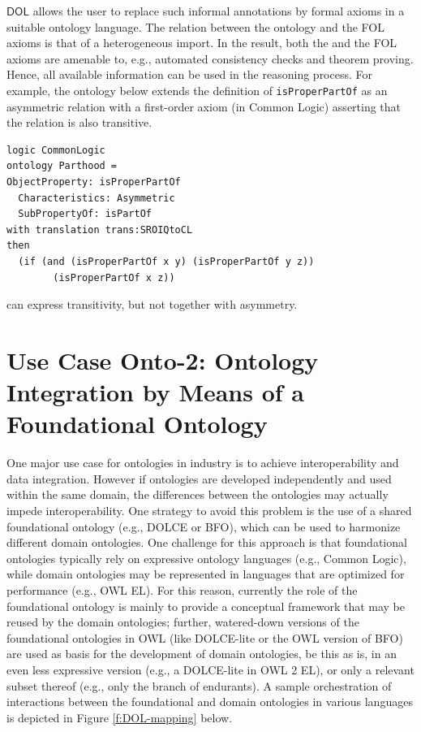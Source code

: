 \documentclass[10pt,fleqn,final]{scrreprt}
\newcommand*{\DOL}{\ensuremath{\mathsf{DOL}}\xspace}
\newenvironment{definitions}[0]{\medskip }{}
\begin{document}
\begin{definitions}
\DOL allows the user to replace such informal annotations by formal axioms in a suitable ontology 
language. The relation between the \OWL ontology and the FOL axioms is that of a heterogeneous 
import. In the result, both the \OWL and the FOL axioms are amenable to, e.g., automated consistency 
checks and theorem proving. Hence, all available information can be used in the reasoning process.
For example, the ontology below extends the \OWL definition of \texttt{isProperPartOf} as an asymmetric relation
with a first-order axiom (in Common Logic) asserting that the relation is also transitive.
\begin{lstlisting}[basicstyle=\small\ttfamily,language=dolText,morekeywords={logic,ontology,props,ObjectProperty,Class,DisjointUnionOf,SubClassOf,Characteristics,Transitive,Asymmetric,SubPropertyOf,DisjointClasses,EquivalentTo,inverse,only,forall,iff,if,or,exists},escapechar=@,mathescape]
logic CommonLogic
ontology Parthood =
ObjectProperty: isProperPartOf  
  Characteristics: Asymmetric  
  SubPropertyOf: isPartOf 
with translation trans:SROIQtoCL
then
  (if (and (isProperPartOf x y) (isProperPartOf y z)) 
        (isProperPartOf x z))
\end{lstlisting}
\OWL can express transitivity, but not together with asymmetry.

\section{Use Case Onto-2: Ontology Integration by Means of a Foundational Ontology}
One major use case for ontologies in industry is to achieve interoperability and data integration. 
However if ontologies are developed independently and used  within the same domain, the 
differences between the ontologies may actually impede interoperability. One strategy to avoid this 
problem is the use of a shared  foundational ontology (e.g., DOLCE or BFO), which can be used to 
harmonize different domain ontologies. One challenge for this approach is that foundational 
ontologies typically rely on expressive ontology languages (e.g., Common Logic), while domain 
ontologies may be represented in languages that are optimized for performance (e.g., OWL EL). For 
this reason, currently the role of the foundational ontology is mainly to provide a conceptual 
framework that may be reused by the  domain ontologies; further, watered-down versions of the 
foundational ontologies in OWL (like DOLCE-lite or the OWL version of BFO) are used as basis for 
the  development of domain ontologies, be this as is, in an even less expressive version (e.g., a 
DOLCE-lite in OWL 2 EL), or only a relevant subset thereof (e.g., only the branch of endurants). A 
sample orchestration of interactions between the foundational and domain ontologies in various 
languages is depicted in Figure \ref{f:DOL-mapping} below.


\end{definitions}
\end{document}

